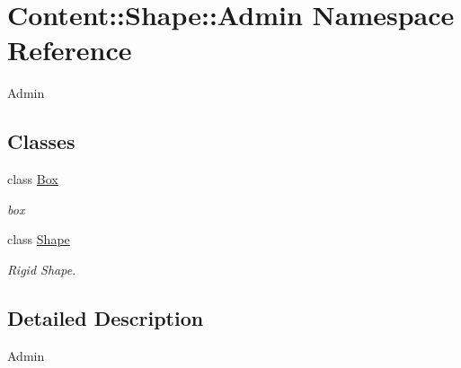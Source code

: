 \hypertarget{namespaceContent_1_1Shape_1_1Admin}{
\section{Content::Shape::Admin Namespace Reference}
\label{namespaceContent_1_1Shape_1_1Admin}
}


Admin  
\subsection*{Classes}
\begin{DoxyCompactItemize}
\item 
class \hyperlink{classContent_1_1Shape_1_1Admin_1_1Box}{Box}
\begin{DoxyCompactList}\small\item\em box \item\end{DoxyCompactList}\item 
class \hyperlink{classContent_1_1Shape_1_1Admin_1_1Shape}{Shape}
\begin{DoxyCompactList}\small\item\em Rigid Shape. \item\end{DoxyCompactList}\end{DoxyCompactItemize}


\subsection{Detailed Description}
Admin 